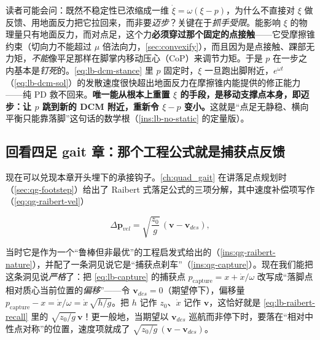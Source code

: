 \begin{insight}\label{ins:lb-must-step}
读者可能会问：既然不稳定性已浓缩成一维 $\dot\xi=\omega(\xi-p)$，为什么不直接对 $\xi$ 做反馈、用地面反力把它拉回来，而非要\emph{迈步}？关键在于\emph{抓手受限}。能影响 $\xi$ 的物理量只有地面反力，而对点足，这个力\textbf{必须穿过那个固定的点接触}——它受摩擦锥约束（切向力不能超过 $\mu$ 倍法向力，\cref{sec:convexify}），而且因为是点接触、踝部无力矩，\emph{不能}像平足那样在脚掌内移动压心（CoP）来调节力矩。于是 $p$ 在一步之内基本是\emph{钉死}的。\cref{eq:lb-dcm-stance} 里 $p$ 固定时，$\xi$ 一旦跑出脚附近，$e^{\omega t}$（\cref{eq:lb-dcm-sol}）的发散速度很快超出地面反力在摩擦锥内能提供的修正能力——纯 PD 救不回来。\textbf{唯一能从根本上重置 $\xi$ 的手段，是移动支撑点本身，即迈步：让 $p$ 跳到新的 DCM 附近，重新令 $\xi-p$ 变小。}这就是“点足无静稳、横向平衡只能靠落脚”这句话的数学根（\cref{ins:lb-no-static} 的定量版）。
\end{insight}

\subsection{回看四足 gait 章：那个工程公式就是捕获点反馈}
\label{subsec:lb-raibert-link}

现在可以兑现本章开头埋下的承接钩子。\cref{ch:quad_gait} 在讲落足点规划时（\cref{sec:qg-footstep}）给出了 Raibert 式落足公式的三项分解，其中速度补偿项写作（\cref{eq:qg-raibert-vel}）

\begin{equation}
  \Delta\mathbf{p}_{vel}=\sqrt{\frac{z_0}{g}}\,(\mathbf{v}-\mathbf{v}_{des}),
  \label{eq:lb-raibert-recall}
\end{equation}

当时它是作为一个“鲁棒但非最优”的工程启发式给出的（\cref{ins:qg-raibert-nature}），并配了一条洞见说它是“捕获点刹车”（\cref{ins:qg-capture}）。现在我们能把这条洞见说\emph{严格}了：把 \cref{eq:lb-capture} 的捕获点 $p_{\mathrm{capture}}=x+\dot x/\omega$ 改写成“落脚点相对质心当前位置的\emph{偏移}”——令 $\mathbf{v}_{des}=0$（期望停下），偏移量 $p_{\mathrm{capture}}-x=\dot x/\omega=\dot x\,\sqrt{h/g}$。把 $h$ 记作 $z_0$、$\dot x$ 记作 $\mathbf{v}$，这恰好就是 \cref{eq:lb-raibert-recall} 里的 $\sqrt{z_0/g}\,\mathbf{v}$！更一般地，当期望以 $\mathbf{v}_{des}$ 巡航而非停下时，要落在“相对中性点对称”的位置，速度项就成了 $\sqrt{z_0/g}\,(\mathbf{v}-\mathbf{v}_{des})$。

